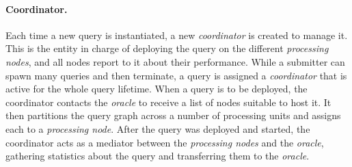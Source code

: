 \paragraph*{Coordinator.}
Each time a new query is instantiated, a new \emph{coordinator} is created to manage it. This is the
entity in charge of deploying the query on the different \emph{processing nodes}, and all nodes report to
it about their performance. While a submitter can spawn many queries and then terminate, a query is
assigned a \emph{coordinator} that is active for the whole query lifetime. When a query is to be
deployed, the coordinator contacts the \emph{oracle} to receive a list of nodes suitable to host it. 
It then partitions the query graph across a number of processing units and assigns each to a
\emph{processing node}.
After the query was deployed and started, the coordinator acts as a mediator between the
\emph{processing nodes} and the \emph{oracle}, gathering statistics about the query and transferring them
to the \emph{oracle}.
\vspace{-10pt}
